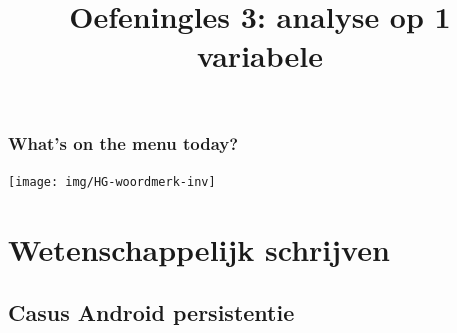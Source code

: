 \documentclass{beamer}
\title[Onderzoekstechnieken]{Oefeningles 3: analyse op 1 variabele}
\author{}
\date{ }
\begin{document}

\HoGentLogo

\begin{frame}[plain]
  \titlepage
\end{frame}




\begin{frame}
  \frametitle{What's on the menu today?}
	\tableofcontents

  \texttt{[image: img/HG-woordmerk-inv]}
\end{frame}
\section{Wetenschappelijk schrijven}
\subsection{Casus Android persistentie}
\end{document}
